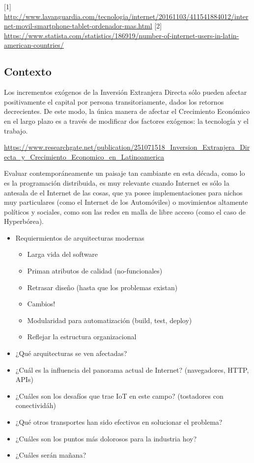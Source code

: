 [1] \url{http://www.lavanguardia.com/tecnologia/internet/20161103/411541884012/internet-movil-smartphone-tablet-ordenador-mas.html}
[2] \url{https://www.statista.com/statistics/186919/number-of-internet-users-in-latin-american-countries/}

\subsection{Contexto} %
\label{sub:contexto}


Los incrementos exógenos de la Inversión Extranjera Directa sólo 
pueden afectar positivamente el capital por persona transitoriamente, dados los retornos 
decrecientes. De este modo, la única manera de afectar el Crecimiento Económico en el largo plazo 
es a través de modificar dos factores exógenos: la tecnología y el trabajo. 

\url{https://www.researchgate.net/publication/251071518_Inversion_Extranjera_Directa_y_Crecimiento_Economico_en_Latinoamerica}

Evaluar contemporáneamente un paisaje tan cambiante en esta década, como lo es la programación distribuida, es muy relevante cuando Internet es sólo la antesala de el Internet de las cosas, que ya posee implementaciones para nichos muy particulares (como el Internet de los Automóviles) o movimientos altamente políticos y sociales, como son las redes en malla de libre acceso (como el caso de Hyperbórea).

\begin{itemize}
  \item Requiermientos de arquitecturas modernas
  
  \begin{itemize}
    \item Larga vida del software
    \item Priman atributos de calidad (no-funcionales)
    \item Retrasar diseño (hasta que los problemas existan)
    \item Cambios!
    \item Modularidad para automatización (build, test, deploy)
    \item Reflejar la estructura organizacional
  \end{itemize}

  \item ¿Qué arquitecturas se ven afectadas?
  \item ¿Cuál es la influencia del panorama actual de Internet? (navegadores, HTTP, APIs)
  \item ¿Cuáles son los desafíos que trae IoT en este campo? (tostadores con conectividáh)
  \item ¿Qué otros transportes han sido efectivos en solucionar el problema?
  \item ¿Cuáles son los puntos más dolorosos para la industria hoy?
  \item ¿Cuáles serán mañana?
\end{itemize}

